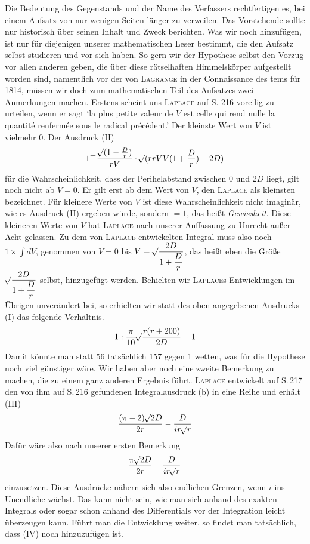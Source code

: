 Die Bedeutung des Gegenstands und der Name des Verfassers rechtfertigen es, bei einem Aufsatz von nur wenigen Seiten länger zu verweilen. Das Vorstehende sollte nur historisch über seinen Inhalt und Zweck berichten. Was wir noch hinzufügen, ist nur für diejenigen unserer mathematischen Leser bestimmt, die den Aufsatz selbst studieren und vor sich haben. So gern wir der Hypothese selbst den Vorzug vor allen anderen geben, die über diese rätselhaften Himmelskörper aufgestellt worden sind, namentlich vor der von \textsc{Lagrange} in der Connaissance des tems für 1814, müssen wir doch zum mathematischen Teil des Aufsatzes zwei Anmerkungen machen. Erstens scheint uns \textsc{Laplace} auf S. 216 voreilig zu urteilen, wenn er sagt `la plus petite valeur de $V$ est celle qui rend nulle la quantité renfermée sous le radical précédent.' Der kleinste Wert von $V$ ist vielmehr 0. Der Ausdruck (II)
\[1{}^{\displaystyle -}\frac{\mathord{{}^{}\!\surd}(1-\frac{D}{r})}{rV}\cdot\mathord{{}^{}\!\surd}(rrVV(1+\frac{D}{r})-2D)\]
für die Wahrscheinlichkeit, dass der Perihelabstand zwischen 0 und $2D$ liegt, gilt noch nicht ab $V=0$. Er gilt erst ab dem Wert von $V$, den \textsc{Laplace} als kleinsten bezeichnet. Für kleinere Werte von $V$ ist diese Wahrscheinlichkeit nicht imaginär, wie es Ausdruck (II) ergeben würde, sondern $= 1$, das heißt \emph{Gewissheit}. Diese kleineren Werte von $V$ hat \textsc{Laplace} nach unserer Auffassung zu Unrecht außer Acht gelassen. Zu dem von \textsc{Laplace} entwickelten Integral muss also noch $1\times\int dV$, genommen von $V = 0$ bis $V = \mathord{{}^{}\!\surd}\dfrac{2D}{1+\dfrac{D}{r}}$, das heißt eben die Größe $\mathord{{}^{}\!\surd}\dfrac{2D}{1+\dfrac{D}{r}}$ selbst, hinzugefügt werden. Behielten wir \textsc{Laplace}s Entwicklungen im Übrigen unverändert bei, so erhielten wir statt des oben angegebenen Ausdrucks (I) das folgende Verhältnis.
\[1 : \frac{\pi}{10}\mathord{{}^{}\!\surd}\frac{r(r+200)}{2D} - 1\]
Damit könnte man statt 56 tatsächlich 157 gegen 1 wetten, was für die Hypothese noch viel günstiger wäre. Wir haben aber noch eine zweite Bemerkung zu machen, die zu einem ganz anderen Ergebnis führt. \textsc{Laplace} entwickelt auf S.\,217 den von ihm auf S.\,216 gefundenen Integralausdruck (b) in eine Reihe und erhält (III)
\[\frac{(\pi-2)\mathord{{}^{}\!\surd}2D}{2r} - \frac{D}{ir\mathord{{}^{}\!\surd}r}\]
Dafür wäre also nach unserer ersten Bemerkung
\[
\frac{\pi\mathord{{}^{}\!\surd}2D}{2r} - \frac{D}{ir\mathord{{}^{}\!\surd}r}
\]
einzusetzen. Diese Ausdrücke nähern sich also endlichen Grenzen, wenn $i$ ins Unendliche wächst. Das kann nicht sein, wie man sich anhand des exakten Integrals oder sogar schon anhand des Differentials vor der Integration leicht überzeugen kann. Führt man die Entwicklung weiter, so findet man tatsächlich, dass (IV) noch hinzuzufügen ist.
